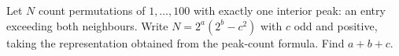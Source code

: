 Let $N$ count permutations of $1,\ldots,100$ with exactly one interior peak: an entry exceeding both neighbours. Write $N=2^a(2^b-c^2)$ with $c$ odd and positive, taking the representation obtained from the peak-count formula. Find $a+b+c$.
